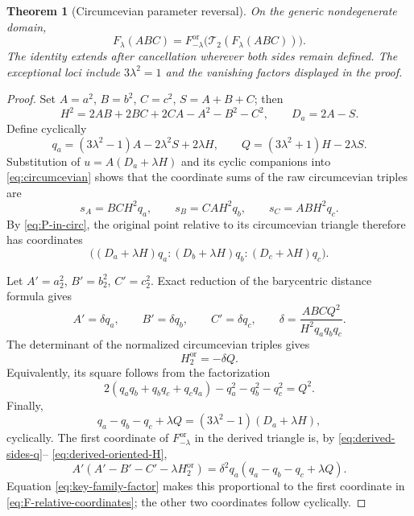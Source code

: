 \documentclass[11pt]{article}
\newtheorem{theorem}{Theorem}
\newcommand{\Circ}{\mathcal T_2}
\begin{document}
\begin{theorem}[Circumcevian parameter reversal]
\label{thm:F-reversal}
On the generic nondegenerate domain,
\begin{equation}\label{eq:F-circ-law}
 F_\lambda(ABC)=F_{-\lambda}^{\mathrm{or}}
 \bigl(\Circ(F_\lambda(ABC))\bigr).
\end{equation}
The identity extends after cancellation wherever both sides remain defined.
The exceptional loci include $3\lambda^2=1$ and the vanishing factors
displayed in the proof.
\end{theorem}

\begin{proof}
Set $A=a^2$, $B=b^2$, $C=c^2$, $S=A+B+C$; then
\[
 H^2=2AB+2BC+2CA-A^2-B^2-C^2,\qquad D_a=2A-S.
\]
Define cyclically
\begin{equation}\label{eq:q-family}
 q_a=(3\lambda^2-1)A-2\lambda^2S+2\lambda H,\qquad
 Q=(3\lambda^2+1)H-2\lambda S.
\end{equation}
Substitution of $u=A(D_a+\lambda H)$ and its cyclic companions into
\eqref{eq:circumcevian} shows that the coordinate sums of the raw
circumcevian triples are
\[
 s_A=BCH^2q_a,\qquad s_B=CAH^2q_b,\qquad s_C=ABH^2q_c.
\]
By \eqref{eq:P-in-circ}, the original point relative to its circumcevian
triangle therefore has coordinates
\begin{equation}\label{eq:F-relative-coordinates}
 \bigl((D_a+\lambda H)q_a:
       (D_b+\lambda H)q_b:
       (D_c+\lambda H)q_c\bigr).
\end{equation}

Let $A'=a_2^2$, $B'=b_2^2$, $C'=c_2^2$.  Exact reduction of the
barycentric distance formula gives
\begin{equation}\label{eq:derived-sides-q}
 A'=\delta q_a,\qquad B'=\delta q_b,\qquad C'=\delta q_c,\qquad
 \delta=\frac{ABCQ^2}{H^2q_aq_bq_c}.
\end{equation}
The determinant of the normalized circumcevian triples gives
\begin{equation}\label{eq:derived-oriented-H}
 H_2^{\mathrm{or}}=-\delta Q.
\end{equation}
Equivalently, its square follows from the factorization
\[
 2(q_aq_b+q_bq_c+q_cq_a)-q_a^2-q_b^2-q_c^2=Q^2.
\]
Finally,
\begin{equation}\label{eq:key-family-factor}
 q_a-q_b-q_c+\lambda Q
 =(3\lambda^2-1)(D_a+\lambda H),
\end{equation}
cyclically.  The first coordinate of $F_{-\lambda}^{\mathrm{or}}$ in the
derived triangle is, by \eqref{eq:derived-sides-q}--
\eqref{eq:derived-oriented-H},
\[
 A'(A'-B'-C'-\lambda H_2^{\mathrm{or}})
 =\delta^2q_a(q_a-q_b-q_c+\lambda Q).
\]
Equation \eqref{eq:key-family-factor} makes this proportional to the first
coordinate in \eqref{eq:F-relative-coordinates}; the other two coordinates
follow cyclically.
\end{proof}
\end{document}
